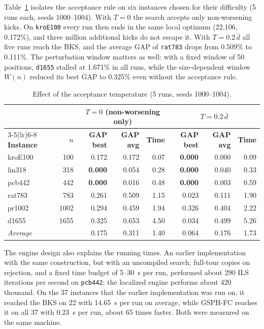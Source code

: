 \documentclass[runningheads]{llncs}
\begin{document}
Table~\ref{tab:ablation} isolates the acceptance rule on six instances
chosen for their difficulty (5 runs each, seeds 1000--1004). With $T=0$
the search accepts only non-worsening kicks. On \texttt{kroE100} every
run then ends in the same local optimum (22{,}106, 0.172\%), and three
million additional kicks do not escape it. With $T=0.2\,\bar d$ all five
runs reach the BKS, and the average GAP of \texttt{rat783} drops from
0.509\% to 0.111\%. The perturbation window matters as well: with a
fixed window of 50 positions, \texttt{d1655} stalled at 1.671\% in all
runs, while the size-dependent window $W(n)$ reduced its best GAP to
0.325\% even without the acceptance rule.

\begin{table}
\caption{Effect of the acceptance temperature (5 runs, seeds
1000--1004).}
\label{tab:ablation}
\centering\scriptsize
\begin{tabular}{@{}lrrrrrrr@{}}
\toprule
& & \multicolumn{3}{c}{$T=0$ (non-worsening only)} & \multicolumn{3}{c}{$T=0.2\,\bar d$} \\
\cmidrule(lr){3-5}\cmidrule(lr){6-8}
\textbf{Instance} & $n$ & \textbf{GAP best} & \textbf{GAP avg} & \textbf{Time} & \textbf{GAP best} & \textbf{GAP avg} & \textbf{Time} \\
\midrule
kroE100 &  100 & 0.172 & 0.172 & 0.07 & \textbf{0.000} & 0.000 & 0.09 \\
lin318  &  318 & \textbf{0.000} & 0.054 & 0.28 & \textbf{0.000} & 0.040 & 0.33 \\
pcb442  &  442 & \textbf{0.000} & 0.016 & 0.48 & \textbf{0.000} & 0.003 & 0.59 \\
rat783  &  783 & 0.261 & 0.509 & 1.15 & 0.023 & 0.111 & 1.90 \\
pr1002  & 1002 & 0.294 & 0.459 & 1.94 & 0.326 & 0.404 & 2.22 \\
d1655   & 1655 & 0.325 & 0.653 & 4.50 & 0.034 & 0.499 & 5.26 \\
\midrule
\textit{Average} & & 0.175 & 0.311 & 1.40 & 0.064 & 0.176 & 1.73 \\
\bottomrule
\end{tabular}
\end{table}

The engine design also explains the running times. An earlier
implementation with the same construction, but with an uncompiled
search, full-tour copies on rejection, and a fixed time budget of
5--30~s per run, performed about 290 ILS iterations per second on
\texttt{pcb442}; the localized engine performs about 420 thousand. On
the 37 instances that the earlier implementation was run on, it reached
the BKS on 22 with 14.65~s per run on average, while GSPH-FC reaches it
on all 37 with 0.23~s per run, about 65 times faster. Both were measured
on the same machine.
\end{document}
